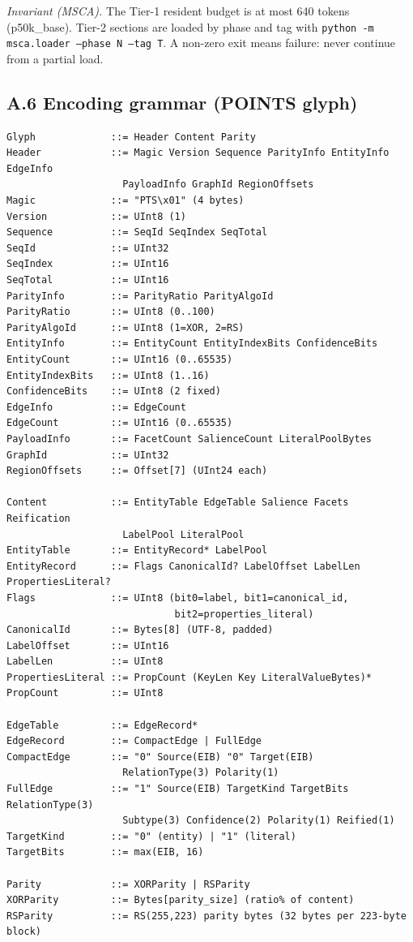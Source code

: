 \textit{Invariant (MSCA).} The Tier-1 resident budget is at most 640 tokens (p50k\_base). Tier-2 sections are loaded by phase and tag with \texttt{python -m msca.loader --phase N --tag T}. A non-zero exit means failure: never continue from a partial load.

\subsection*{A.6 Encoding grammar (POINTS glyph)}

\begin{verbatim}
Glyph             ::= Header Content Parity
Header            ::= Magic Version Sequence ParityInfo EntityInfo EdgeInfo
                    PayloadInfo GraphId RegionOffsets
Magic             ::= "PTS\x01" (4 bytes)
Version           ::= UInt8 (1)
Sequence          ::= SeqId SeqIndex SeqTotal
SeqId             ::= UInt32
SeqIndex          ::= UInt16
SeqTotal          ::= UInt16
ParityInfo        ::= ParityRatio ParityAlgoId
ParityRatio       ::= UInt8 (0..100)
ParityAlgoId      ::= UInt8 (1=XOR, 2=RS)
EntityInfo        ::= EntityCount EntityIndexBits ConfidenceBits
EntityCount       ::= UInt16 (0..65535)
EntityIndexBits   ::= UInt8 (1..16)
ConfidenceBits    ::= UInt8 (2 fixed)
EdgeInfo          ::= EdgeCount
EdgeCount         ::= UInt16 (0..65535)
PayloadInfo       ::= FacetCount SalienceCount LiteralPoolBytes
GraphId           ::= UInt32
RegionOffsets     ::= Offset[7] (UInt24 each)

Content           ::= EntityTable EdgeTable Salience Facets Reification
                    LabelPool LiteralPool
EntityTable       ::= EntityRecord* LabelPool
EntityRecord      ::= Flags CanonicalId? LabelOffset LabelLen PropertiesLiteral?
Flags             ::= UInt8 (bit0=label, bit1=canonical_id,
                             bit2=properties_literal)
CanonicalId       ::= Bytes[8] (UTF-8, padded)
LabelOffset       ::= UInt16
LabelLen          ::= UInt8
PropertiesLiteral ::= PropCount (KeyLen Key LiteralValueBytes)*
PropCount         ::= UInt8

EdgeTable         ::= EdgeRecord*
EdgeRecord        ::= CompactEdge | FullEdge
CompactEdge       ::= "0" Source(EIB) "0" Target(EIB)
                    RelationType(3) Polarity(1)
FullEdge          ::= "1" Source(EIB) TargetKind TargetBits RelationType(3)
                    Subtype(3) Confidence(2) Polarity(1) Reified(1)
TargetKind        ::= "0" (entity) | "1" (literal)
TargetBits        ::= max(EIB, 16)

Parity            ::= XORParity | RSParity
XORParity         ::= Bytes[parity_size] (ratio% of content)
RSParity          ::= RS(255,223) parity bytes (32 bytes per 223-byte block)
\end{verbatim}

